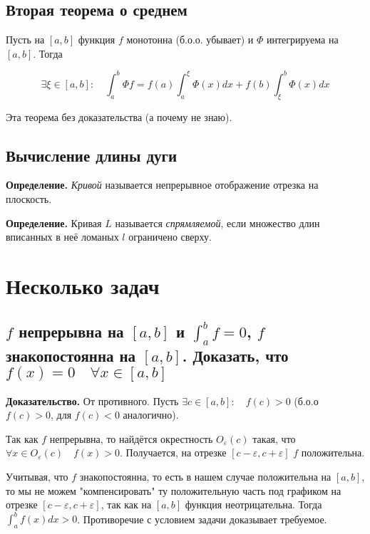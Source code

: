 \documentclass[a4paper]{article}
\begin{document}
\begin{definit}
\subsection*{Вторая теорема о среднем}
Пусть на $[a,b]$ функция $f$ монотонна (б.о.о. убывает) и $\Phi$ интегрируема на $[a,b]$. Тогда

\[
\exists \xi \in [a,b]: \quad \int_a^b \Phi f = f(a) \int_a^{\xi} \Phi(x)dx + f(b) \int_{\xi}^b\Phi(x)dx
\]

Эта теорема без доказательства (а почему не знаю).
\end{definit}

\begin{definit}

\subsection*{Вычисление длины дуги}

\textbf{Определение.} \textit{Кривой} называется непрерывное отображение отрезка на плоскость.

\textbf{Определение.}  Кривая $L$ называется \textit{спрямляемой}, если множество длин вписанных в неё ломаных $l$ ограничено сверху.
\end{definit}


\section*{Несколько задач}

\subsection{$f$ непрерывна на $[a,b]$ и $\int_a^b f = 0$, $f$ знакопостоянна на $[a,b]$. Доказать, что $f(x)=0 \quad \forall x \in [a,b]$}

\textbf{Доказательство.} От противного. Пусть $\exists c \in [a,b]: \quad f(c)>0$ (б.о.о $f(c)>0$, для $f(c) < 0$ аналогично).

Так как $f$ непрерывна, то найдётся окрестность $O_{\varepsilon}(c)$ такая, что $\forall x \in O_{\varepsilon}(c) \quad f(x) > 0$. Получается, на отрезке $[c-\varepsilon, c+\varepsilon]$ $f$ положительна. 

Учитывая, что $f$ знакопостоянна, то есть в нашем случае положительна на $[a,b]$, то мы не можем "компенсировать" ту положительную часть под графиком на отрезке $[c-\varepsilon, c+\varepsilon]$, так как на $[a,b]$ функция неотрицательна. Тогда $\int_a^b f(x)dx > 0$. Противоречие с условием задачи доказывает требуемое.
\end{document}
